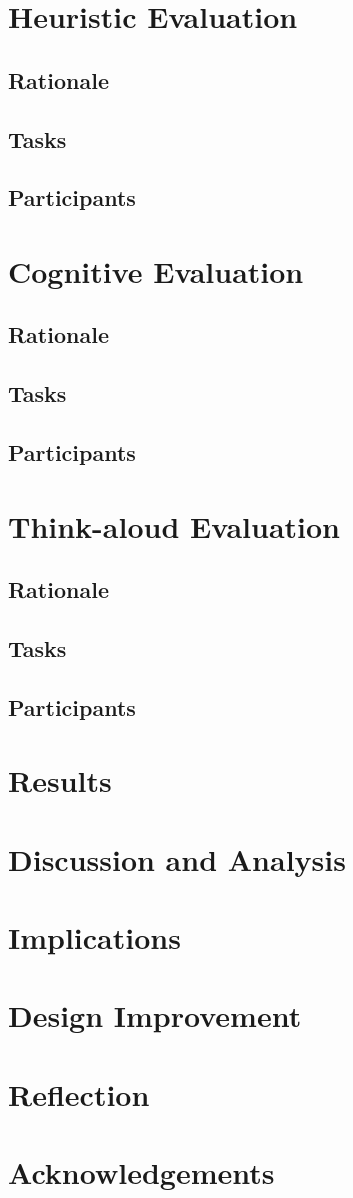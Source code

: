 \documentclass[pdftex,12pt,a4paper]{report}
\begin{document}

\tableofcontents

\chapter{Heuristic Evaluation}
\section{Rationale}
\section{Tasks}
\section{Participants}

\chapter{Cognitive Evaluation}
\section{Rationale}
\section{Tasks}
\section{Participants}

\chapter{Think-aloud Evaluation}
\section{Rationale}
\section{Tasks}
\section{Participants}

\chapter{Results}
\chapter{Discussion and Analysis}
\chapter{Implications}
\chapter{Design Improvement}
\chapter{Reflection}
\chapter{Acknowledgements}
\end{document}
